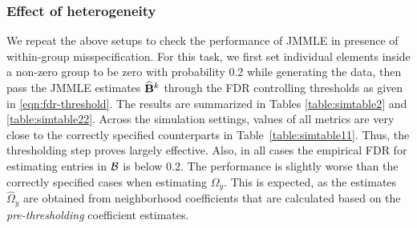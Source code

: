 \subsubsection{Effect of heterogeneity}
We repeat the above setups to check the performance of JMMLE in presence of within-group misspecification. For this task, we first set individual elements inside a non-zero group to be zero with probability 0.2 while generating the data, then pass the JMMLE estimates $\widehat {{\mathbf{B}}}^k$ through the FDR controlling thresholds as given in \eqref{eqn:fdr-threshold}. The results are summarized in Tables \ref{table:simtable2} and \ref{table:simtable22}. Across the simulation settings, values of all metrics are very close to the correctly specified counterparts in Table~\ref{table:simtable11}. Thus, the thresholding step 
proves largely effective. Also, in all cases the empirical FDR for estimating entries in ${\cal{B}}$ is below 0.2. The performance is slightly worse than the correctly specified cases when estimating $\Omega_y$. This is expected, as the estimates $\widehat \Omega_y$ are obtained from neighborhood coefficients that are calculated based on the {\it pre-thresholding} coefficient estimates.
%
